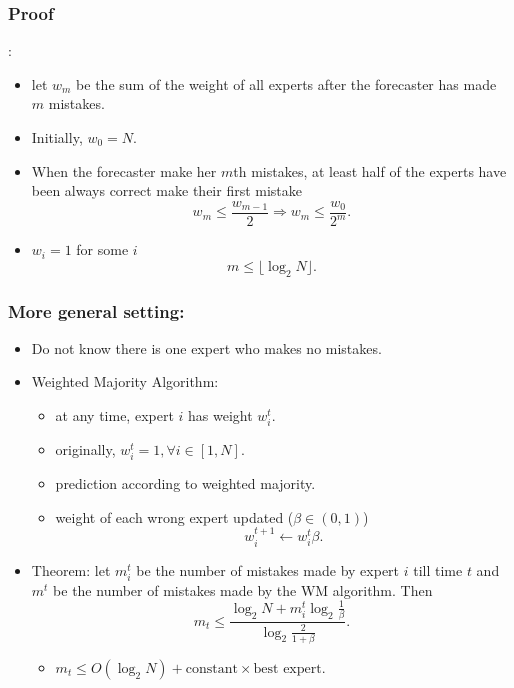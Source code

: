 \documentclass{beamer}
\begin{document}
\begin{frame}
\frametitle{Proof}:
\begin{itemize}
\item let $w_m$ be the sum of the weight of all experts after the forecaster has made $m$ mistakes.
\pause
\item Initially, $w_0 = N.$
\pause
\item When the forecaster make her $m$th mistakes, at least half of the experts have been always correct make their first mistake
\begin{equation*}
w_m \le \frac{w_{m-1}}{2}\Longrightarrow w_m\le \frac{w_0}{2^m}.
\end{equation*} 
\pause
\item $w_i =1$  for some $i$
\begin{equation*}
m\le \lfloor\log_2 N\rfloor.
\end{equation*}
\end{itemize}


\end{frame}
\begin{frame}
\frametitle{More general setting:}
\begin{itemize}
\item Do not know there is one expert who makes no mistakes. 
\pause
\item Weighted Majority Algorithm:
\begin{itemize}
	\item at any time, expert $i$ has weight $w_i^t$.
	\item originally, $w_i^t = 1, \forall i\in[1,N]$.
	\item prediction according to weighted majority. 
	\item weight of each wrong expert updated ($\beta\in(0,1)$)
	$$w_i^{t+1}\leftarrow w_i^t\beta.$$
\end{itemize}
\pause
\item Theorem: let $m_i^t$ be the number of mistakes made by expert $i$ till time $t$ and $m^t$ be the number of mistakes made by the WM algorithm. Then
$$m_t \le \frac{\log_2 N+m_i^t\log_2\frac{1}{\beta}}{\log_2 \frac{2}{1+\beta}}.$$
\begin{itemize}
\item $m_t\le O(\log_2 N)+\text{constant}\times\text{best expert}$.
\end{itemize}

\end{itemize}
\end{frame}
\end{document}
